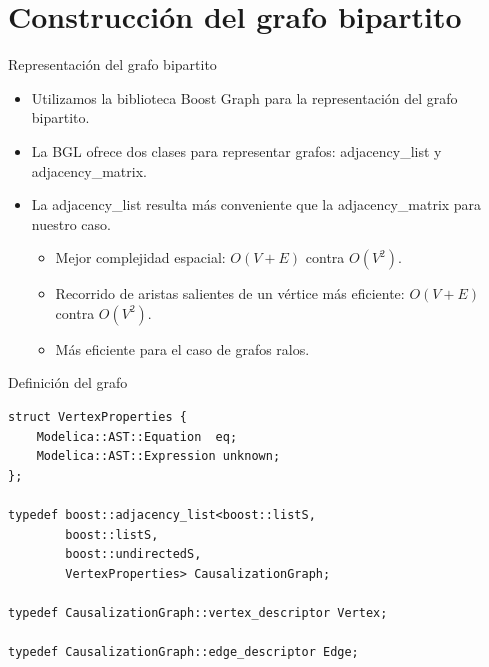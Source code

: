 \section{Construcción del grafo bipartito}

\begin{frame}{Representación del grafo bipartito}
    \begin{itemize}
        \item<1-> Utilizamos la biblioteca Boost Graph para la representación del grafo bipartito.
        \item<2-> La BGL ofrece dos clases para representar grafos: adjacency\_list y adjacency\_matrix.
        \item<3-> La adjacency\_list resulta más conveniente que la adjacency\_matrix para nuestro caso. 
        \begin{itemize}
            \item<4-> Mejor complejidad espacial: $O(V+E)$ contra $O(V^{2})$.
            \item<5-> Recorrido de aristas salientes de un vértice más eficiente: $O(V+E)$ contra $O(V^{2})$.
            \item<6-> Más eficiente para el caso de grafos ralos.
        \end{itemize}
    \end{itemize}
\end{frame}

\begin{frame}[fragile]{Definición del grafo}
   \fontsize{9pt}{7.2}\selectfont
    \begin{lstlisting}
struct VertexProperties {
    Modelica::AST::Equation  eq;
    Modelica::AST::Expression unknown;
};

typedef boost::adjacency_list<boost::listS,
        boost::listS,
        boost::undirectedS,
        VertexProperties> CausalizationGraph;

typedef CausalizationGraph::vertex_descriptor Vertex;

typedef CausalizationGraph::edge_descriptor Edge;
    \end{lstlisting}
\end{frame}

